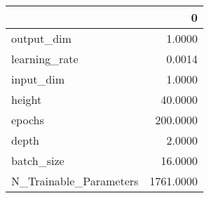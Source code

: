\begin{tabular}{lr}
\toprule
{} &          0 \\
\midrule
output\_dim             &     1.0000 \\
learning\_rate          &     0.0014 \\
input\_dim              &     1.0000 \\
height                 &    40.0000 \\
epochs                 &   200.0000 \\
depth                  &     2.0000 \\
batch\_size             &    16.0000 \\
N\_Trainable\_Parameters &  1761.0000 \\
\bottomrule
\end{tabular}

